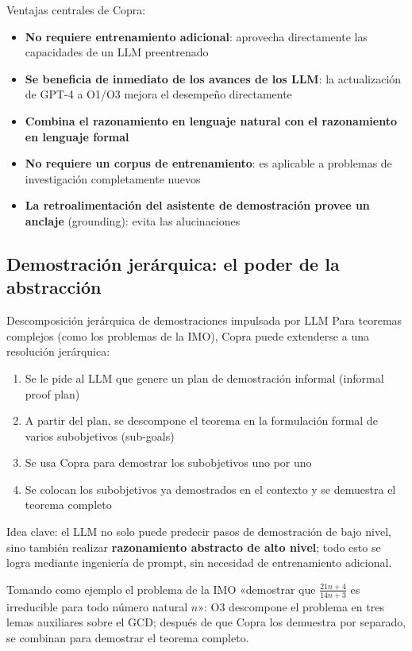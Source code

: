Ventajas centrales de Copra:
\begin{itemize}
    \item \textbf{No requiere entrenamiento adicional}: aprovecha directamente las capacidades de un LLM preentrenado
    \item \textbf{Se beneficia de inmediato de los avances de los LLM}: la actualización de GPT-4 a O1/O3 mejora el desempeño directamente
    \item \textbf{Combina el razonamiento en lenguaje natural con el razonamiento en lenguaje formal}
    \item \textbf{No requiere un corpus de entrenamiento}: es aplicable a problemas de investigación completamente nuevos
    \item \textbf{La retroalimentación del asistente de demostración provee un anclaje} (grounding): evita las alucinaciones
\end{itemize}

\subsection{Demostración jerárquica: el poder de la abstracción}

\begin{importantbox}{Descomposición jerárquica de demostraciones impulsada por LLM}
Para teoremas complejos (como los problemas de la IMO), Copra puede extenderse a una resolución jerárquica:
\begin{enumerate}
    \item Se le pide al LLM que genere un plan de demostración informal (informal proof plan)
    \item A partir del plan, se descompone el teorema en la formulación formal de varios subobjetivos (sub-goals)
    \item Se usa Copra para demostrar los subobjetivos uno por uno
    \item Se colocan los subobjetivos ya demostrados en el contexto y se demuestra el teorema completo
\end{enumerate}
Idea clave: el LLM no solo puede predecir pasos de demostración de bajo nivel, sino también realizar \textbf{razonamiento abstracto de alto nivel}; todo esto se logra mediante ingeniería de prompt, sin necesidad de entrenamiento adicional.
\end{importantbox}

Tomando como ejemplo el problema de la IMO «demostrar que $\frac{21n+4}{14n+3}$ es irreducible para todo número natural $n$»: O3 descompone el problema en tres lemas auxiliares sobre el GCD; después de que Copra los demuestra por separado, se combinan para demostrar el teorema completo.

